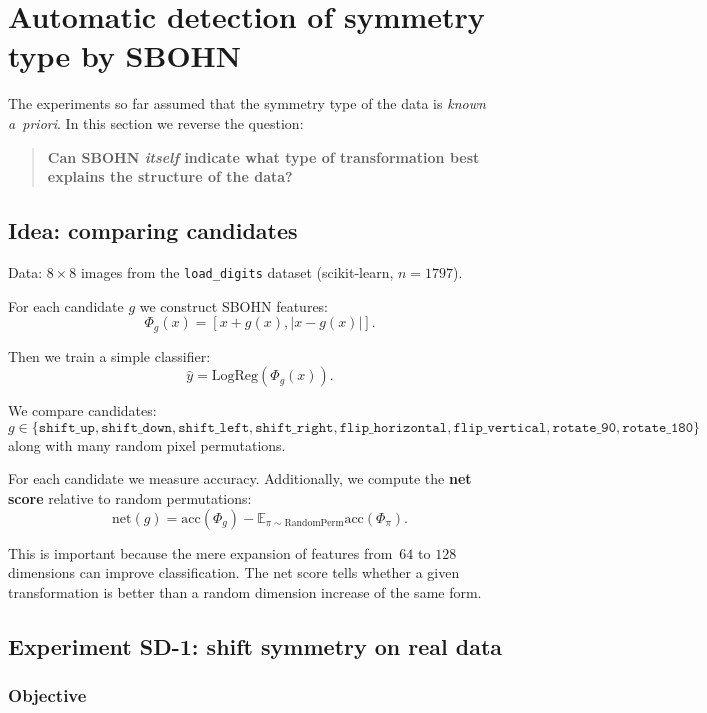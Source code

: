 \documentclass[11pt,a4paper]{report}
\begin{document}
\section{Automatic detection of symmetry type by SBOHN}\label{sec:symmetry_discovery}

The experiments so far assumed that the symmetry type of the data is \emph{known a~priori}. In this section we reverse the question:

\begin{quote}
\textbf{Can SBOHN \emph{itself} indicate what type of transformation best explains the structure of the data?}
\end{quote}

\subsection{Idea: comparing candidates}

Data: $8\times 8$ images from the \texttt{load\_digits} dataset (scikit-learn, $n=1797$).

For each candidate $g$ we construct SBOHN features:
\[
\Phi_g(x)=
[x+g(x),|x-g(x)|].
\]

Then we train a simple classifier:
\[
\hat y = \mathrm{LogReg}(\Phi_g(x)).
\]

We compare candidates:
\[
g\in\{
\texttt{shift\_up},
\texttt{shift\_down},
\texttt{shift\_left},
\texttt{shift\_right},
\texttt{flip\_horizontal},
\texttt{flip\_vertical},
\texttt{rotate\_90},
\texttt{rotate\_180}
\}
\]
along with many random pixel permutations.

For each candidate we measure accuracy. Additionally, we compute the \textbf{net score} relative to random permutations:
\[
\mathrm{net}(g)
=
\mathrm{acc}(\Phi_g)
-
\mathbb E_{\pi\sim \mathrm{RandomPerm}}
\mathrm{acc}(\Phi_\pi).
\]

This is important because the mere expansion of features from~$64$ to $128$ dimensions can improve classification. The net score tells whether a given transformation is better than a random dimension increase of the same form.

\subsection{Experiment SD-1: shift symmetry on real data}

\subsubsection{Objective}
\end{document}
